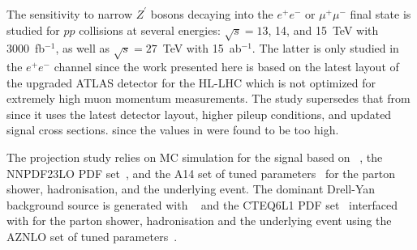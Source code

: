 \subsubsection{}


The sensitivity to narrow $Z^\prime$ bosons decaying into the $e^+e^-$ or $\mu^+\mu^-$ final state
is studied for $pp$ collisions at several \com energies: $\sqrt{s} = 13$, 14, and 15~TeV
with 3000~fb$^{-1}$,
as well as $\sqrt{s} = 27$~TeV with 15~ab$^{-1}$.
The latter is only studied in the $e^+e^-$ channel since the work presented here is based on the latest
layout of the upgraded ATLAS detector for the HL-LHC which is not optimized for extremely high
muon momentum measurements.
The study supersedes that from  since it uses the latest detector
layout, higher pileup conditions, and updated signal cross sections. since the values in
 were found to be too high.

The projection study relies on MC simulation for the signal based on ~\cite{pythia8}, the \sloppy\mbox{\textsc{NNPDF23LO}} PDF set~\cite{Ball:2012cx}, and the A14 set of tuned parameters~\cite{ATL-PHYS-PUB-2014-021} for the parton shower, hadronisation, and the underlying event. The dominant Drell-Yan background source is generated with \powhegbox~\cite{powheg1,powheg2} and the \textsc{CTEQ6L1} PDF set~\cite{Pumplin:2002vw} interfaced with  for the parton shower, hadronisation and the underlying event using the \textsc{AZNLO} set of tuned parameters~\cite{AZNLO:2014}.

